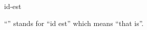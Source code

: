 \documentclass{stex}
\begin{document}
\begin{smodule}{id-est}
\begin{sparagraph}[style=symdoc]
``'' stands for
``\foreignlanguage{latin}{id est}'' which means ``that is''.
\end{sparagraph}
\end{smodule}
\end{document}
